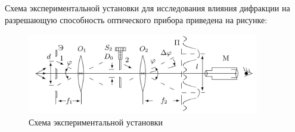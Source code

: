 Схема экспериментальной установки для исследования влияния дифракции на разрешающую способность оптического прибора приведена на рисунке:

\begin{figure}[H]
	\centering
	\includegraphics[width=0.9\textwidth]{../Изображения/Схема установки. Разрешающая способность.png}
	\caption{Схема экспериментальной установки}
\end{figure}

